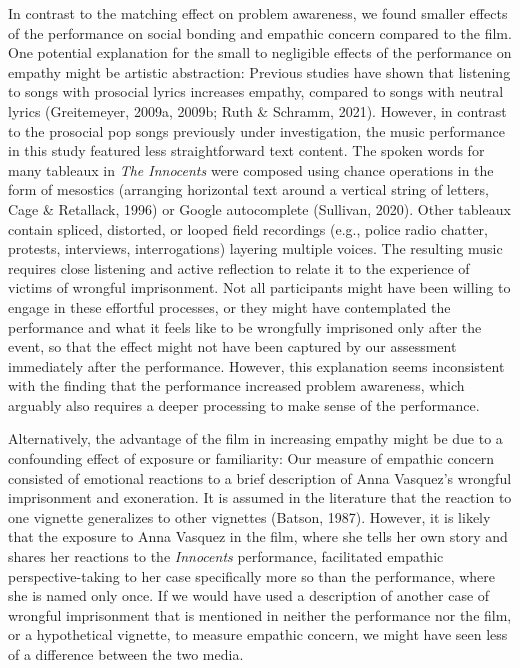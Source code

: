 \documentclass[
  man,floatsintext]{apa6}
\begin{document}
In contrast to the matching effect on problem awareness, we found smaller effects of the performance on social bonding and empathic concern compared to the film. One potential explanation for the small to negligible effects of the performance on empathy might be artistic abstraction: Previous studies have shown that listening to songs with prosocial lyrics increases empathy, compared to songs with neutral lyrics (Greitemeyer, 2009a, 2009b; Ruth \& Schramm, 2021). However, in contrast to the prosocial pop songs previously under investigation, the music performance in this study featured less straightforward text content. The spoken words for many tableaux in \emph{The Innocents} were composed using chance operations in the form of mesostics (arranging horizontal text around a vertical string of letters, Cage \& Retallack, 1996) or Google autocomplete (Sullivan, 2020). Other tableaux contain spliced, distorted, or looped field recordings (e.g., police radio chatter, protests, interviews, interrogations) layering multiple voices. The resulting music requires close listening and active reflection to relate it to the experience of victims of wrongful imprisonment. Not all participants might have been willing to engage in these effortful processes, or they might have contemplated the performance and what it feels like to be wrongfully imprisoned only after the event, so that the effect might not have been captured by our assessment immediately after the performance. However, this explanation seems inconsistent with the finding that the performance increased problem awareness, which arguably also requires a deeper processing to make sense of the performance.

Alternatively, the advantage of the film in increasing empathy might be due to a confounding effect of exposure or familiarity: Our measure of empathic concern consisted of emotional reactions to a brief description of Anna Vasquez's wrongful imprisonment and exoneration. It is assumed in the literature that the reaction to one vignette generalizes to other vignettes (Batson, 1987). However, it is likely that the exposure to Anna Vasquez in the film, where she tells her own story and shares her reactions to the \emph{Innocents} performance, facilitated empathic perspective-taking to her case specifically more so than the performance, where she is named only once. If we would have used a description of another case of wrongful imprisonment that is mentioned in neither the performance nor the film, or a hypothetical vignette, to measure empathic concern, we might have seen less of a difference between the two media.
\end{document}
